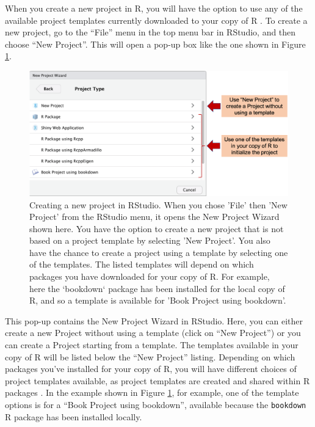\documentclass[]{tufte-book}
\begin{document}
When you create a new project in R, you will have the option to use any of
the available project templates currently downloaded to your copy of R
\citep{rstudioprojecttemplate}. To create a new project, go to the ``File'' menu
in the top menu bar in RStudio, and then choose ``New Project''. This will open
a pop-up box like the one shown in Figure \ref{fig:createnewproject}.

\begin{figure}
\includegraphics[width=\textwidth]{figures/create_new_project} \caption[Creating a new project in RStudio]{Creating a new project in RStudio. When you chose 'File' then 'New Project' from the RStudio menu, it opens the New Project Wizard shown here. You have the option to create a new project that is not based on a project template by selecting 'New Project'. You also have the chance to create a project using a template by selecting one of the templates. The listed templates will depend on which packages you have downloaded for your copy of R. For example, here the `bookdown` package has been installed for the local copy of R, and so a template is available for 'Book Project using bookdown'.}\label{fig:createnewproject}
\end{figure}

This pop-up contains the New Project Wizard in RStudio. Here, you can either
create a new Project without using a template (click on ``New Project'') or you
can create a Project starting from a template. The templates available in your
copy of R will be listed below the ``New Project'' listing. Depending on which
packages you've installed for your copy of R, you will have different choices of
project templates available, as project templates are created and shared
within R packages \citep{rstudioprojecttemplate}. In the example shown in
Figure \ref{fig:createnewproject}, for example, one of the template options is
for a ``Book Project using bookdown'', available because the \texttt{bookdown} R package
has been installed locally.
\end{document}
